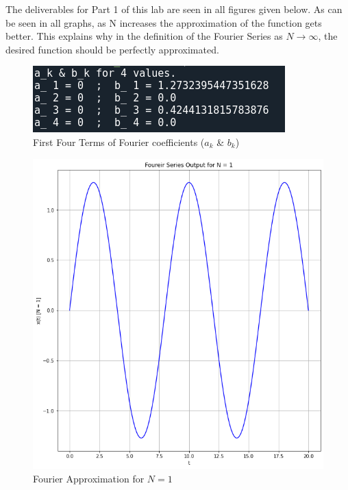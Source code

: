 \documentclass[12pt]{report}
\begin{document}
The deliverables for Part 1 of this lab are seen in all figures given below. As can be seen in all graphs, as N increases the approximation of the function 
gets better. This explains why in the definition of the Fourier Series as $N\to\infty$, the desired function should be perfectly approximated.
\\
\begin{figure}[h!]
  \centering
  \includegraphics[scale=1]{p1t1.png}
  \caption{First Four Terms of Fourier coefficients ($a_k$ \& $b_k$)}
  \label{fig: p1t1}
\end{figure}
\begin{figure}[h!]
  \centering
  \includegraphics[scale=.5]{p1t2-0.png}
  \caption{Fourier Approximation for $N = 1$}
  \label{fig: p1t2-0}
\end{figure}
\end{document}
